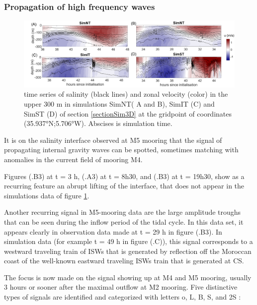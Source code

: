 \subsubsection{Propagation of high frequency waves}

\begin{figure}[!h]
 \includegraphics[width=\textwidth]{./GBR3D/US_M4SimMIV.png}
 \caption {time series of salinity (black lines) and zonal velocity (color) in the upper 300 m in simulations SimNT( A and B), SimIT (C) and SimST (D) of section \ref{sectionSim3D} at the gridpoint of coordinates (35.937°N;5.706°W). Abscises is simulation time. }
 \label{Fig_moor_USs}
\end{figure}

It is on the salinity interface observed at M5 mooring that the signal of propagating internal gravity waves can be spotted, sometimes matching with anomalies in the current field of mooring M4.

Figures (.B3) at t = 3 h, (.A3) at t = 8h30, and (.B3) at t = 19h30, show as a recurring feature an abrupt lifting of the interface, that does not appear in the simulations data of figure \ref{Fig_moor_USs}.

Another recurring signal in M5-mooring data are the large amplitude troughs that can be seen during the inflow period of the tidal cycle. In this data set, it appears clearly in observation data made at t = 29 h in figure (.B3). In simulation data (for example t = 49 h in figure (.C)), this signal corresponds to a westward traveling train of ISWs that is generated by reflection off the Moroccan coast of the well-known eastward traveling ISWs train that is generated at CS.

The focus is now made on the signal showing up at M4 and M5 mooring, usually 3 hours or sooner after the maximal outflow at M2 mooring. Five distinctive types of signals are identified and categorized with letters o, L, B, S, and 2S :

